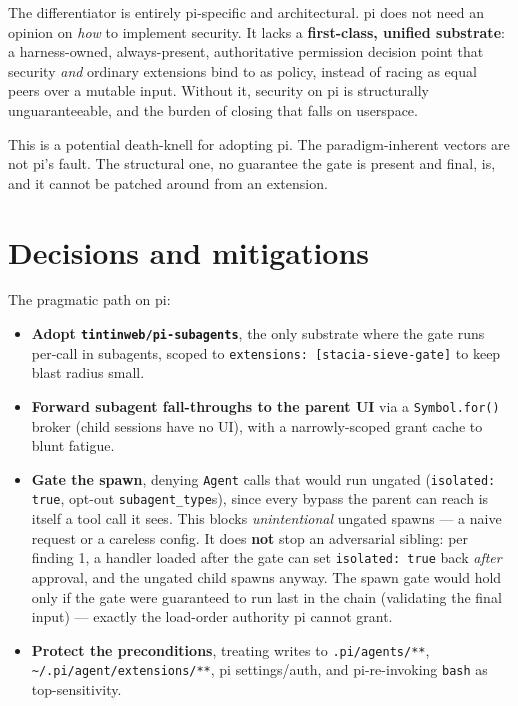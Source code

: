 \documentclass[11pt]{article}
\newcommand{\code}[1]{\texttt{#1}}
\begin{document}
The differentiator is entirely pi-specific and architectural. pi does not need an
opinion on \emph{how} to implement security. It lacks a \textbf{first-class,
unified substrate}: a harness-owned, always-present, authoritative permission
decision point that security \emph{and} ordinary extensions bind to as policy,
instead of racing as equal peers over a mutable input. Without it, security on pi
is structurally unguaranteeable, and the burden of closing that falls on
userspace.

This is a potential death-knell for adopting pi. The paradigm-inherent vectors
are not pi's fault. The structural one, no guarantee the gate is present and
final, is, and it cannot be patched around from an extension.

\section*{Decisions and mitigations}

The pragmatic path on pi:

\begin{itemize}
  \item \textbf{Adopt \code{tintinweb/pi-subagents}}, the only substrate where the
    gate runs per-call in subagents, scoped to
    \code{extensions: [stacia-sieve-gate]} to keep blast radius small.
  \item \textbf{Forward subagent fall-throughs to the parent UI} via a
    \code{Symbol.for()} broker (child sessions have no UI), with a
    narrowly-scoped grant cache to blunt fatigue.
  \item \textbf{Gate the spawn}, denying \code{Agent} calls that would run ungated
    (\code{isolated: true}, opt-out \code{subagent\_type}s), since every bypass
    the parent can reach is itself a tool call it sees. This blocks
    \emph{unintentional} ungated spawns --- a naive request or a careless config.
    It does \textbf{not} stop an adversarial sibling: per finding 1, a handler
    loaded after the gate can set \code{isolated: true} back \emph{after}
    approval, and the ungated child spawns anyway. The spawn gate would hold only
    if the gate were guaranteed to run last in the chain (validating the final
    input) --- exactly the load-order authority pi cannot grant.
  \item \textbf{Protect the preconditions}, treating writes to
    \code{.pi/agents/**}, \code{\textasciitilde/.pi/agent/extensions/**}, pi
    settings/auth, and pi-re-invoking \code{bash} as top-sensitivity.
\end{itemize}
\end{document}
